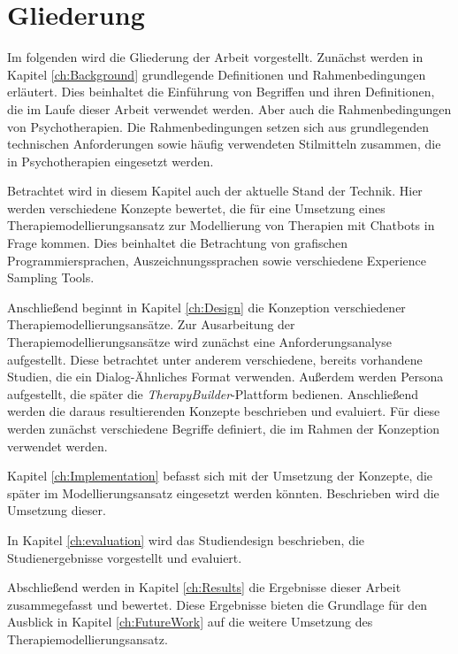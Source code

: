 
\section{Gliederung}

Im folgenden wird die Gliederung der Arbeit vorgestellt. Zunächst werden in Kapitel \ref{ch:Background} grundlegende Definitionen und Rahmenbedingungen erläutert. Dies beinhaltet die Einführung von Begriffen und ihren Definitionen, die im Laufe dieser Arbeit verwendet werden. Aber auch die Rahmenbedingungen von Psychotherapien. Die Rahmenbedingungen setzen sich aus grundlegenden technischen Anforderungen sowie häufig verwendeten Stilmitteln zusammen, die in Psychotherapien eingesetzt werden. 

Betrachtet wird in diesem Kapitel auch der aktuelle Stand der Technik. Hier werden verschiedene Konzepte bewertet, die für eine Umsetzung eines Therapiemodellierungsansatz zur Modellierung von Therapien mit Chatbots in Frage kommen. Dies beinhaltet die Betrachtung von grafischen Programmiersprachen, Auszeichnungssprachen sowie verschiedene Experience Sampling Tools.

Anschließend beginnt in Kapitel \ref{ch:Design} die Konzeption verschiedener Therapiemodellierungsansätze. Zur Ausarbeitung der Therapiemodellierungsansätze wird zunächst eine Anforderungsanalyse aufgestellt. Diese betrachtet unter anderem verschiedene, bereits vorhandene Studien, die ein Dialog-Ähnliches Format verwenden. Außerdem werden Persona aufgestellt, die später die \emph{TherapyBuilder}-Plattform bedienen. Anschließend werden die daraus resultierenden Konzepte beschrieben und evaluiert. Für diese werden zunächst verschiedene Begriffe definiert, die im Rahmen der Konzeption verwendet werden.

Kapitel \ref{ch:Implementation} befasst sich mit der Umsetzung der Konzepte, die später im Modellierungsansatz eingesetzt werden könnten. Beschrieben wird die Umsetzung dieser. 

In Kapitel \ref{ch:evaluation} wird das Studiendesign beschrieben, die Studienergebnisse vorgestellt und evaluiert. 

Abschließend werden in Kapitel \ref{ch:Results} die Ergebnisse dieser Arbeit zusammegefasst und bewertet. Diese Ergebnisse bieten die Grundlage für den Ausblick in Kapitel \ref{ch:FutureWork} auf die weitere Umsetzung des Therapiemodellierungsansatz.



